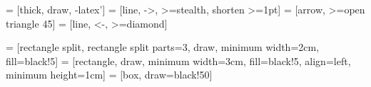   = [thick, draw, -latex']
 = [line, ->, >=stealth, shorten >=1pt]
 = [arrow, >=open triangle 45]   %
 = [line, <-, >=diamond]           %

 = [rectangle split, rectangle split parts=3, draw, minimum width=2cm, fill=black!5] %
 = [rectangle, draw, minimum width=3cm, fill=black!5, align=left, minimum height=1cm]
 = [box, draw=black!50]

